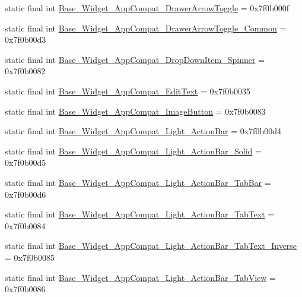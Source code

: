 \begin{CompactItemize}
\item 
static final int \hyperlink{classandroid_1_1support_1_1v7_1_1mediarouter_1_1_r_1_1style_1b78507b5359a23495a3e8f7af0bf006}{Base\_\-Widget\_\-AppCompat\_\-DrawerArrowToggle} = 0x7f0b000f
\item 
static final int \hyperlink{classandroid_1_1support_1_1v7_1_1mediarouter_1_1_r_1_1style_7c1f6e7faaec6234aaac19529fc98c71}{Base\_\-Widget\_\-AppCompat\_\-DrawerArrowToggle\_\-Common} = 0x7f0b00d3
\item 
static final int \hyperlink{classandroid_1_1support_1_1v7_1_1mediarouter_1_1_r_1_1style_d75f6281826f5d1302734d8dcb24e409}{Base\_\-Widget\_\-AppCompat\_\-DropDownItem\_\-Spinner} = 0x7f0b0082
\item 
static final int \hyperlink{classandroid_1_1support_1_1v7_1_1mediarouter_1_1_r_1_1style_79b4c5a79d39dce6c6487aca29dbe0c2}{Base\_\-Widget\_\-AppCompat\_\-EditText} = 0x7f0b0035
\item 
static final int \hyperlink{classandroid_1_1support_1_1v7_1_1mediarouter_1_1_r_1_1style_18276082cb05ff6143b9109b90bd071e}{Base\_\-Widget\_\-AppCompat\_\-ImageButton} = 0x7f0b0083
\item 
static final int \hyperlink{classandroid_1_1support_1_1v7_1_1mediarouter_1_1_r_1_1style_b32b79f376ce8531f0e71dc137d355bf}{Base\_\-Widget\_\-AppCompat\_\-Light\_\-ActionBar} = 0x7f0b00d4
\item 
static final int \hyperlink{classandroid_1_1support_1_1v7_1_1mediarouter_1_1_r_1_1style_9d4848799373140ec4349ea70ee1aac2}{Base\_\-Widget\_\-AppCompat\_\-Light\_\-ActionBar\_\-Solid} = 0x7f0b00d5
\item 
static final int \hyperlink{classandroid_1_1support_1_1v7_1_1mediarouter_1_1_r_1_1style_4a08aa1afb4b8bd8704039996eb7f649}{Base\_\-Widget\_\-AppCompat\_\-Light\_\-ActionBar\_\-TabBar} = 0x7f0b00d6
\item 
static final int \hyperlink{classandroid_1_1support_1_1v7_1_1mediarouter_1_1_r_1_1style_f6db1459eda594729aa3a25f13e4a5cd}{Base\_\-Widget\_\-AppCompat\_\-Light\_\-ActionBar\_\-TabText} = 0x7f0b0084
\item 
static final int \hyperlink{classandroid_1_1support_1_1v7_1_1mediarouter_1_1_r_1_1style_6f239ab68a98f5c43d7be13c84f28cd7}{Base\_\-Widget\_\-AppCompat\_\-Light\_\-ActionBar\_\-TabText\_\-Inverse} = 0x7f0b0085
\item 
static final int \hyperlink{classandroid_1_1support_1_1v7_1_1mediarouter_1_1_r_1_1style_126b5c0151659d0c406d3427751c36e7}{Base\_\-Widget\_\-AppCompat\_\-Light\_\-ActionBar\_\-TabView} = 0x7f0b0086

\end{CompactItemize}
